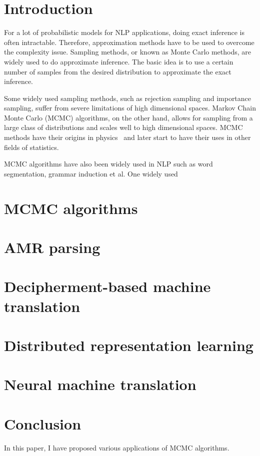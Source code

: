 \documentclass[12pt,leqno]{report}
\begin{document}
\begin{CJK}{UTF8}{cyberbit}
\tableofcontents

\chapter{Introduction}

For a lot of probabilistic models for NLP applications, doing exact inference is often intractable. Therefore, approximation methods have to be used to overcome the
complexity issue. Sampling methods, or known as Monte Carlo methods, are widely used to do approximate inference. The basic idea is to use a certain number of
samples from the desired distribution to approximate the exact inference.


Some widely used sampling methods, such as rejection sampling and importance sampling, suffer from severe limitations of high dimensional spaces. Markov Chain Monte Carlo (MCMC)
algorithms, on the other hand, allows for sampling from a large class of distributions and scales well to high dimensional spaces. MCMC methods have their origins in physics~\cite{metropolis1949monte} and later start to have
their uses in other fields of statistics.


MCMC algorithms have also been widely used in NLP such as word segmentation, grammar induction et al. One widely used 
\break

\chapter{MCMC algorithms}
\label{chap:MCMC}

\break

\chapter{AMR parsing}
\label{chap:amr}

\break

\chapter{Decipherment-based machine translation}
\label{chap:decipher}

\break

\chapter{Distributed representation learning}
\label{chap:embedding}

\break

\chapter{Neural machine translation}
\label{chap:nmt}

\break
\chapter{Conclusion}
\label{chap:conclusion}
In this paper, I have proposed various applications of MCMC algorithms.
\break



\appendix
\end{CJK}
\end{document}

